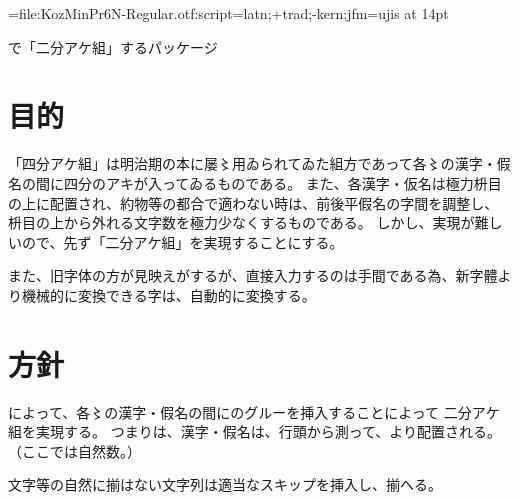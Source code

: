 \documentclass[12pt,landscape,hiragino-pro]{ltjtarticle}
\begin{document}

\makeatletter
\makeatother

\jfont\tradgt={file:KozMinPr6N-Regular.otf:script=latn;+trad;-kern;jfm=ujis} at 14pt

で「二分アケ組」するパッケージ

\section{目的}
「四分アケ組」は明治期の本に屡〻用ゐられてゐた組方であって各〻の漢字・假名の間に四分のアキが入ってゐるものである。
また、各漢字・仮名は極力枡目の上に配置され、約物等の都合で適わない時は、前後平假名の字間を調整し、
枡目の上から外れる文字数を極力少なくするものである。
しかし、実現が難しいので、先ず「二分アケ組」を実現することにする。

また、旧字体の方が見映えがするが、直接入力するのは手間である為、新字體より機械的に変換できる字は、自動的に変換する。

\section{方針}

によって、各〻の漢字・假名の間にのグルーを挿入することによって
二分アケ組を実現する。
つまりは、漢字・假名は、行頭から測って、より配置される。（ここでは自然数。）

文字等の自然に揃はない文字列は適当なスキップを挿入し、揃へる。
\end{document}

